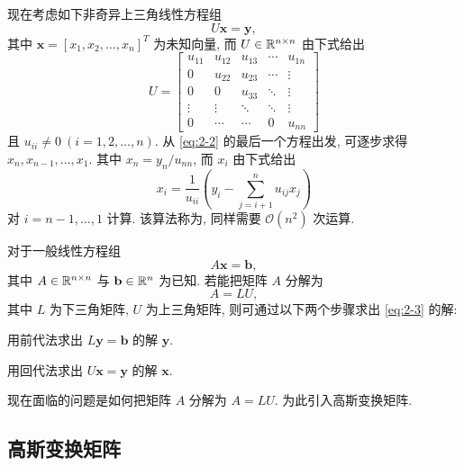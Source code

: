 现在考虑如下非奇异上三角线性方程组
\begin{equation}
  U\mathbf{x}=\mathbf{y},
  \label{eq:2-2}
\end{equation}
其中 $\mathbf{x}=[x_1,x_2,\ldots,x_n]^T$ 为未知向量, 而 $U\in\mathbb{R}^{n\times n}$ 由下式给出
\[
  U=
  \begin{bmatrix}
    u_{11} & u_{12} & u_{13} & \cdots & u_{1n} \\
    0      & u_{22} & u_{23} & \cdots & \vdots \\
    0      & 0      & u_{33} & \ddots & \vdots \\
    \vdots & \vdots & \ddots & \ddots & \vdots \\
    0      & \cdots & \cdots & 0      & u_{nn}
  \end{bmatrix}
\]
且 $u_{ii}\neq0\ (i=1,2,\ldots,n)$. 从 \eqref{eq:2-2} 的最后一个方程出发, 可逐步求得 $x_n,x_{n-1},\ldots,x_1$. 其中 $x_n=y_n/u_{nn}$, 而 $x_i$ 由下式给出
\[
  x_i=\frac{1}{u_{ii}}\left(y_i-\sum_{j=i+1}^{n}u_{ij}x_j\right)
\]
对 $i=n-1,\ldots,1$ 计算. 该算法称为, 同样需要 $\mathcal{O}(n^2)$ 次运算.

对于一般线性方程组
\begin{equation}
  A\mathbf{x}=\mathbf{b},
  \label{eq:2-3}
\end{equation}
其中 $A\in\mathbb{R}^{n\times n}$ 与 $\mathbf{b}\in\mathbb{R}^n$ 为已知. 若能把矩阵 $A$ 分解为
\[
  A=LU,
\]
其中 $L$ 为下三角矩阵, $U$ 为上三角矩阵, 则可通过以下两个步骤求出 \eqref{eq:2-3} 的解:

\begin{parenlist}
  \item 用前代法求出 $L\mathbf{y}=\mathbf{b}$ 的解 $\mathbf{y}$.
  \item 用回代法求出 $U\mathbf{x}=\mathbf{y}$ 的解 $\mathbf{x}$.
\end{parenlist}

现在面临的问题是如何把矩阵 $A$ 分解为 $A=LU$. 为此引入高斯变换矩阵.

\subsection{高斯变换矩阵}


